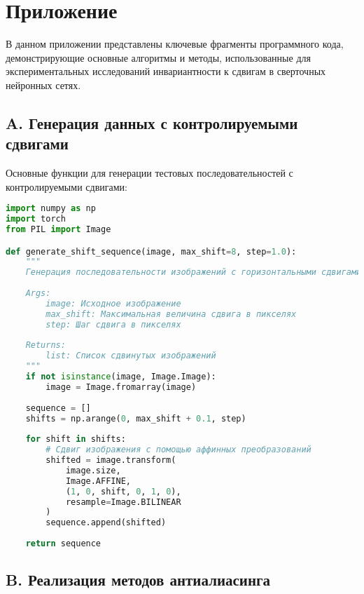 \section*{Приложение}
\label{sec:Appendix} 

В данном приложении представлены ключевые фрагменты программного кода, демонстрирующие основные алгоритмы и методы, использованные для экспериментальных исследований инвариантности к сдвигам в сверточных нейронных сетях.

\subsection*{A. Генерация данных с контролируемыми сдвигами}
\label{appendix:data_generation}

Основные функции для генерации тестовых последовательностей с контролируемыми сдвигами:

\begin{lstlisting}[language=Python]
import numpy as np
import torch
from PIL import Image

def generate_shift_sequence(image, max_shift=8, step=1.0):
    """
    Генерация последовательности изображений с горизонтальными сдвигами.
    
    Args:
        image: Исходное изображение
        max_shift: Максимальная величина сдвига в пикселях
        step: Шаг сдвига в пикселях
            
    Returns:
        list: Список сдвинутых изображений
    """
    if not isinstance(image, Image.Image):
        image = Image.fromarray(image)
        
    sequence = []
    shifts = np.arange(0, max_shift + 0.1, step)
    
    for shift in shifts:
        # Сдвиг изображения с помощью аффинных преобразований
        shifted = image.transform(
            image.size, 
            Image.AFFINE, 
            (1, 0, shift, 0, 1, 0), 
            resample=Image.BILINEAR
        )
        sequence.append(shifted)
            
    return sequence
\end{lstlisting}

\subsection*{B. Реализация методов антиалиасинга}
\label{appendix:antialiasing_code}

